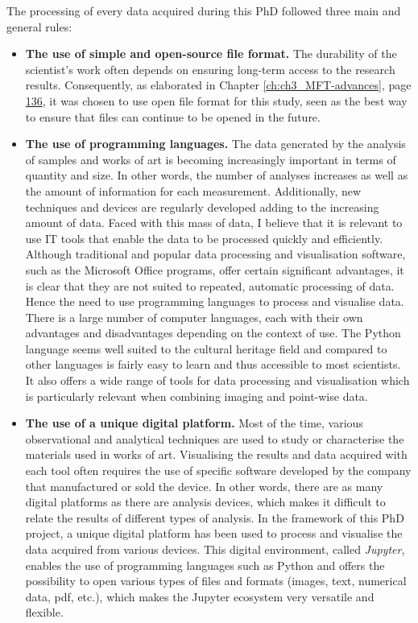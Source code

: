 The processing of every data acquired during this PhD followed three main and general rules:

\begin{itemize}
\item \textbf{The use of simple and open-source file format.} The durability of the scientist's work often depends on ensuring long-term access to the research results. Consequently, as elaborated in Chapter \ref{ch:ch3_MFT-advances}, page \hyperlink{page.136}{136}, it was chosen to use open file format for this study, seen as the best way to ensure that files can continue to be opened in the future.  

\item \textbf{The use of programming languages.} The data generated by the analysis of samples and works of art is becoming increasingly important in terms of quantity and size. In other words, the number of analyses increases as well as the amount of information for each measurement. Additionally, new techniques and devices are regularly developed adding to the increasing amount of data. Faced with this mass of data, I believe that it is relevant to use IT tools that enable the data to be processed quickly and efficiently. Although traditional and popular data processing and visualisation software, such as the Microsoft Office programs, offer certain significant advantages, it is clear that they are not suited to repeated, automatic processing of data. Hence the need to use programming languages to process and visualise data. There is a large number of computer languages, each with their own advantages and disadvantages depending on the context of use. The Python language seems well suited to the cultural heritage field and compared to other languages is fairly easy to learn and thus accessible to most scientists. It also offers a wide range of tools for data processing and visualisation which is particularly relevant when combining imaging and point-wise data.

\item \textbf{The use of a unique digital platform.} Most of the time, various observational and analytical techniques are used to study or characterise the materials used in works of art. Visualising the results and data acquired with each tool often requires the use of specific software developed by the company that manufactured or sold the device. In other words, there are as many digital platforms as there are analysis devices, which makes it difficult to relate the results of different types of analysis. In the framework of this PhD project, a unique digital platform has been used to process and visualise the data acquired from various devices. This digital environment, called \textit{Jupyter}, enables the use of programming languages such as Python and offers the possibility to open  various types of files and formats (images, text, numerical data, pdf, etc.), which makes the Jupyter ecosystem very versatile and flexible. 
\end{itemize}




